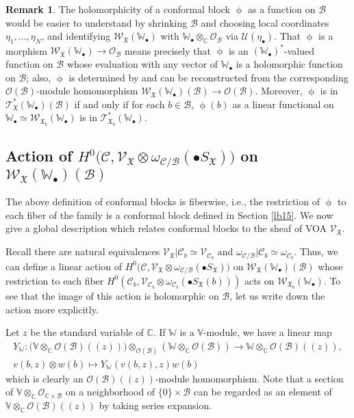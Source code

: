 \documentclass[11pt,b5paper,notitlepage]{article}
\theoremstyle{definition}
\newtheorem{rem}[df]{Remark}
\theoremstyle{plain}
\newcommand{\fk}{\mathfrak}
\newcommand{\mc}{\mathcal}
\newcommand{\scr}{\mathscr}
\newcommand{\SX}{S_{\fk X}}
\newcommand{\blt}{\bullet}
\newcommand{\Vbb}{\mathbb V}
\newcommand{\Wbb}{\mathbb W}
\newcommand{\Cbb}{\mathbb C}
\numberwithin{equation}{section}
\begin{document}
\begin{rem}
The holomorphicity of a conformal block $\upphi$ as a function on $\mc B$ would be easier to understand by shrinking $\mc B$ and choosing local coordinates $\eta_1,\dots,\eta_N$, and identifying $\scr W_{\fk X}(\Wbb_\blt)$  with $\Wbb_\blt\otimes_\Cbb\scr O_{\mc B}$ via $\mc U(\eta_\blt)$. That $\upphi$ is a morphism $\scr W_{\fk X}(\Wbb_\blt)\rightarrow\scr O_{\mc B}$  means precisely that $\upphi$ is an $(\Wbb_\blt)^*$-valued function on $\mc B$ whose evaluation with any vector of $\Wbb_\blt$ is a holomorphic function on $\mc B$; also, $\upphi$ is determined by and can be reconstructed from the corresponding $\scr O(\mc B)$-module homomorphism $\scr W_{\fk X}(\Wbb_\blt)(\mc B)\rightarrow\scr O(\mc B)$. Moreover, $\upphi$ is in $\scr T_{\fk X}^*(\Wbb_\blt)(\mc B)$ if and only if for each $b\in\mc B$, $\upphi(b)$ as a linear functional on $\Wbb_\blt\simeq\scr W_{\fk X_b}(\Wbb_\blt)$ is in $\scr T_{\fk X_b}^*(\Wbb_\blt)$.
\end{rem}





\subsection*{Action of $H^0\big(\mc C,\scr V_{\fk X}\otimes\omega_{\mc C/\mc B}(\blt\SX)\big)$  on $\scr W_{\fk X}(\Wbb_\blt)(\mc B)$}

The above definition of conformal blocks is fiberwise, i.e., the restriction of $\upphi$ to each fiber of the family is a conformal block defined in Section \ref{lb15}. We now give a global description which relates conformal blocks to the sheaf of VOA $\scr V_{\fk X}$.

Recall there are natural equivalences  $\scr V_{\fk X}|\mc C_b\simeq\scr V_{\mc C_b}$ and $\omega_{\mc C/\mc B}|\mc C_b\simeq\omega_{\mc C_b}$. Thus, we can define a linear action of $H^0\big(\mc C,\scr V_{\fk X}\otimes\omega_{\mc C/\mc B}(\blt\SX)\big)$  on $\scr W_{\fk X}(\Wbb_\blt)(\mc B)$ whose restriction to each fiber $H^0(\mc C_b,\scr V_{\mc C_b}\otimes\omega_{\mc C_b}(\blt\SX(b)))$ acts on $\scr W_{\fk X_b}(\Wbb_\blt)$. To see that the image of this action is holomorphic on $\mc B$, let us write down the action more explicitly.




Let $z$ be the standard variable of $\Cbb$. If $\Wbb$ is a $\Vbb$-module, we have a linear map \index{Y@$Y,Y_\Wbb$}
\begin{gather}
Y_\Wbb:\big(\Vbb\otimes_\Cbb\scr O(\mc B)((z))\big)\otimes_{\scr O(\mc B)} (\Wbb\otimes_\Cbb\scr O(\mc B))\rightarrow \Wbb\otimes_\Cbb\scr O(\mc B)((z)),\nonumber\\
v(b,z)\otimes w(b)\mapsto Y_\Wbb(v(b,z),z)w(b)
\end{gather}
which is clearly an $\scr O(\mc B)((z))$-module homomorphism. Note that a section of $\Vbb\otimes_\Cbb\scr O_{\Cbb\times\mc B}$ on a neighborhood of $\{0\}\times \mc B$ can be regarded as an element of $\Vbb\otimes_\Cbb\scr O(\mc B)((z))$ by taking series expansion.
\end{document}
